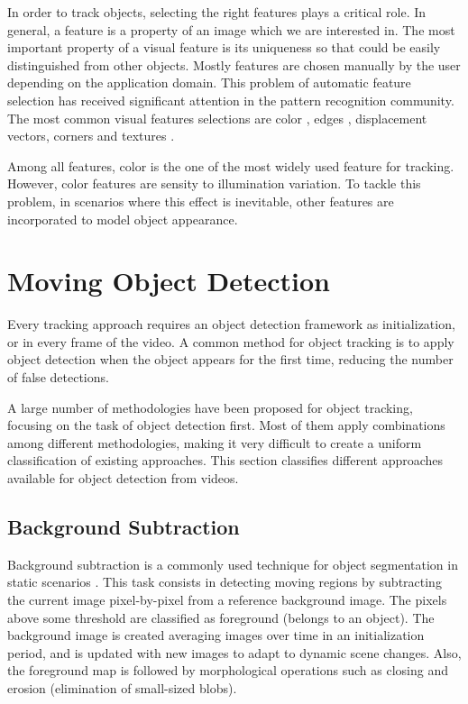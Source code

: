 In order to track objects, selecting the right features plays a critical role.
In general, a feature is a property of an image which we are interested in.
The most important property of a visual feature is its uniqueness so
that could be easily distinguished from other objects. Mostly features are
chosen manually by the user depending on the application domain. This problem of
automatic feature selection has received significant attention in the pattern
recognition community. The most common visual features selections are color
\cite{Paschos2001,Song1996}, edges \cite{Canny1986,Bowyer2001}, displacement
vectors\cite{Black1996,Lucas1981a}, corners\cite{Harris1988} and textures
\cite{Haralick1973,Nickels1997,Mallat1989}.

Among all features, color is the one of the most widely used feature for
tracking. However, color features are sensity to illumination variation. To
tackle this problem, in scenarios where this effect is inevitable, other
features are incorporated to model object appearance.

\section{Moving Object Detection} 
\label{sec::detection}

Every tracking approach requires an object detection framework as
initialization, or in every frame of the video. A common method for object
tracking is to apply object detection when the object appears for the first
time, reducing the number of false detections. 

A large number of methodologies have been proposed for object tracking, focusing
on the task of object detection first. Most of them apply combinations among
different methodologies, making it very difficult to create a uniform
classification of existing approaches. This section classifies
different approaches available for object detection from videos.

\subsection{Background Subtraction}

Background subtraction is a commonly used technique for object segmentation in
static scenarios \cite{McIvor2000}. This task consists in detecting moving
regions by subtracting the current image pixel-by-pixel from a reference
background image. The pixels above some threshold are classified as foreground
(belongs to an object). The background image is created averaging images over
time in an initialization period, and is updated with new images to adapt to
dynamic scene changes. Also, the foreground map is followed by morphological
operations such as closing and erosion (elimination of small-sized blobs).

